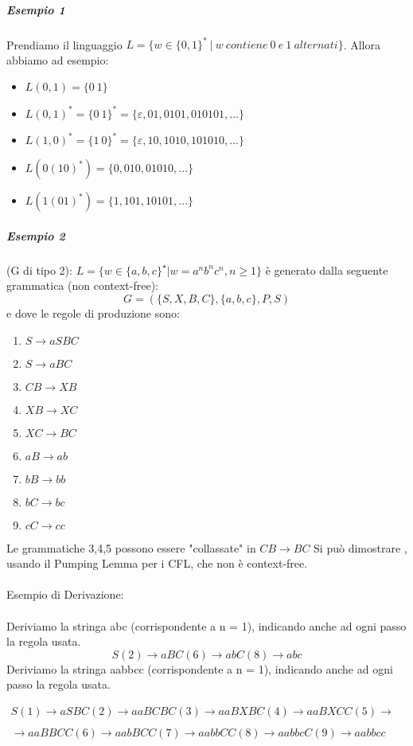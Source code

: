 \documentclass[11pt]{article}
\begin{document}
\subparagraph{Esempio 1} Prendiamo il linguaggio $L = \{w \in \{0,1\}^* \: | \: w \: contiene \: 0 \: e \: 1 \: alternati\}$. Allora abbiamo ad esempio:
\begin{itemize}
	\item $L(0,1) = \{0 \: 1\}$
	\item $L(0,1)^* = \{0 \: 1\}^* = \{\varepsilon , 01, 0101, 010101, ...\}$
	\item $L(1,0)^* = \{1 \: 0\}^* = \{\varepsilon , 10, 1010, 101010, ...\}$
	\item $L(0(10)^* ) = \{0, 010, 01010, ...\}$
	\item $L(1(01)^* ) = \{1, 101, 10101, ...\}$
\end{itemize}

\subparagraph{Esempio 2}(G di tipo 2): $L = \{w \in \{a,b,c\}^{\star} | w = a^nb^nc^n, n\geq 1\}$
è generato dalla seguente grammatica (non context-free): $$ G=(\{S,X,B,C\}, \{a,b,c\}, P, S)$$
e dove le regole di produzione sono:
\begin{enumerate}
	\item $S \rightarrow aSBC$
	\item $S \rightarrow aBC$
	\item $CB \rightarrow XB$
	\item $XB \rightarrow XC$
	\item $XC \rightarrow BC$
	\item $aB \rightarrow ab$
	\item $bB \rightarrow bb$
	\item $bC \rightarrow bc$
	\item $cC \rightarrow cc$
\end{enumerate}
Le grammatiche 3,4,5 possono essere "collassate" in $CB \rightarrow BC$
Si può dimostrare , usando il Pumping Lemma per i CFL, che non è context-free.
\\ \\
Esempio di Derivazione:
\\ \\
Deriviamo la stringa abc (corrispondente a n = 1), indicando anche ad ogni passo la regola usata.
$$ S (2)\rightarrow aBC (6)\rightarrow abC (8)\rightarrow abc$$
Deriviamo la stringa aabbcc (corrispondente a n = 1), indicando anche ad ogni passo la regola usata.

\begin{equation*}\label{stigeiz}\begin{split}
S (1)\rightarrow aSBC (2)\rightarrow aaBCBC (3)\rightarrow aaBXBC (4) \rightarrow aaBXCC (5) \rightarrow \\&\\ \rightarrow aaBBCC (6)\rightarrow aabBCC (7)\rightarrow aabbCC (8)\rightarrow aabbcC (9)\rightarrow aabbcc
\end{split}
\end{equation*}
\end{document}
